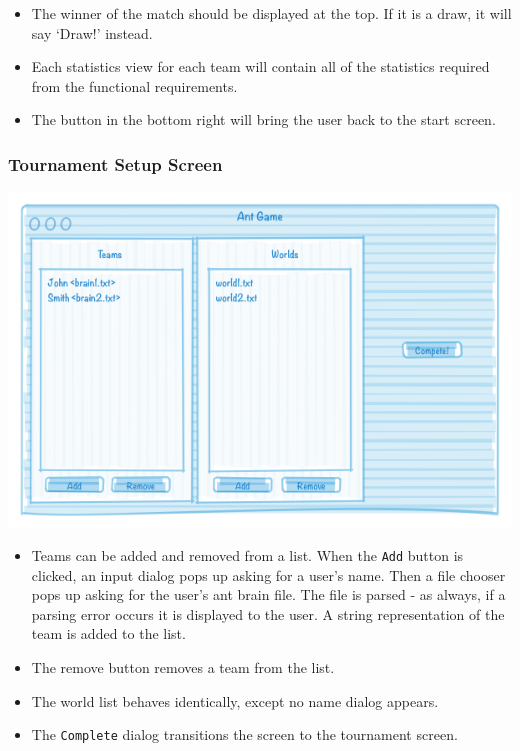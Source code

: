 \documentclass[11pt]{article}
\begin{document}
\begin{itemize}
\item The winner of the match should be displayed at the top. If it is a draw, it will say `Draw!' instead.
\item Each statistics view for each team will contain all of the statistics required from the functional requirements.
\item The button in the bottom right will bring the user back to the start screen.
\end{itemize}

\subsubsection{Tournament Setup Screen}

\begin{center}
\includegraphics[width=\textwidth]{low-level-diagrams/interface/tournament-setup-screen}
\end{center}

\begin{itemize}
\item Teams can be added and removed from a list. When the \texttt{Add} button is clicked, an input dialog pops up asking for a user's name. Then a file chooser pops up asking for the user's ant brain file. The file is parsed - as always, if a parsing error occurs it is displayed to the user. A string representation of the team is added to the list.
\item The remove button removes a team from the list.
\item The world list behaves identically, except no name dialog appears.
\item The \texttt{Complete} dialog transitions the screen to the tournament screen.
\end{itemize}
\end{document}
